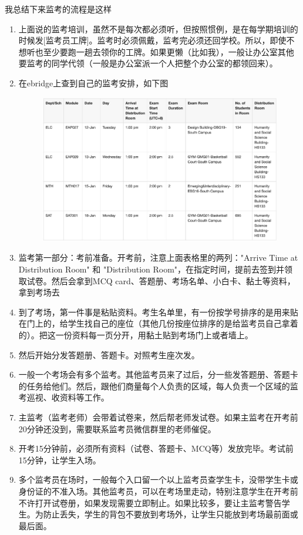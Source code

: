 我总结下来监考的流程是这样
\begin{enumerate}
    \item 上面说的监考培训，虽然不是每次都必须听，但按照惯例，是在每学期培训的时候发[监考员工牌]。监考时必须佩戴，监考完必须还回学校。所以，即使不想听也至少要跑一趟去领你的工牌。如果更懒（比如我），一般让办公室其他要监考的同学代领（一般是办公室派一个人把整个办公室的都领回来）。
    \item 在ebridge上查到自己的监考安排，如下图
        \begin{figure}[H]
            \centering
            \includegraphics[width=0.5\columnwidth]{author-folder/Kai.Wu/invigi-table.jpg}
        \end{figure}
    \item 监考第一部分：考前准备。开考前，注意上面表格里的两列："Arrive Time at Distribution Room" 和 "Distribution Room"，在指定时间，提前去签到并领取试卷。然后会拿到MCQ card、答题册、考场名单、小白卡、黏土等资料，拿到考场去
    \item 到了考场，第一件事是粘贴资料。考生名单里，有一份按学号排序的是用来贴在门上的，给学生找自己的座位（其他几份按座位排序的是给监考员自己拿着的）。把这一份资料每一页分开，用黏土贴到考场门上或者墙上。
    \item 然后开始分发答题册、答题卡。对照考生座次发。
    \item 一般一个考场会有多个监考。其他监考员来了过后，分一些发答题册、答题卡的任务给他们。然后，跟他们商量每个人负责的区域，每人负责一个区域的监考巡视、收资料等工作。
    \item 主监考（监考老师）会带着试卷来，然后帮老师发试卷。如果主监考在开考前20分钟还没到，需要联系监考员微信群里的老师催促。
    \item 开考15分钟前，必须所有资料（试卷、答题卡、MCQ等）发放完毕。考试前15分钟，让学生入场。
    \item 多个监考员在场时，一般每个入口留一个以上监考员查学生卡，没带学生卡或身份证的不准入场。其他监考员，可以在考场里走动，特别注意学生在开考前不许打开试卷册，如果发现需要立即制止。如果比较多，要让主监考警告学生。为防止丢失，学生的背包不要放到考场外，让学生只能放到考场最前面或最后面。

\end{enumerate}
